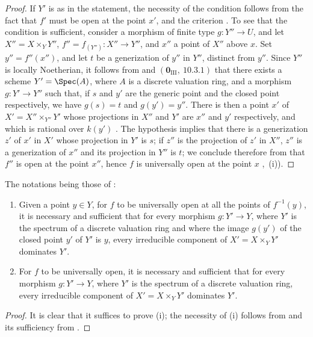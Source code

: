 \begin{proof}
If $Y'$ is as in the statement, the necessity of the condition follows from the fact that $f'$ must be open at the point $x'$, and the criterion .
To see that the condition is sufficient, consider a morphism of finite type $g:Y''\to U$, and let $X''=X\times_Y Y''$, $f''=f_{(Y'')}:X''\to Y''$, and $x''$ a point of $X''$ above $x$.
Set $y''=f''(x'')$, and let $t$ be a generization of $y''$ in $Y''$, distinct from $y''$.
Since $Y''$ is locally Noetherian, it follows from  and $(\mathbf{0}_{\mathrm{III}},~10.3.1)$ that there exists a scheme $Y'=\Spec(A)$, where $A$ is a discrete valuation ring, and a morphism $g:Y'\to Y''$ such that, if $s$ and $y'$ are the generic point and the closed point respectively, we have $g(s)=t$ and $g(y')=y''$.
There is then a point $x'$ of $X'=X''\times_{Y''}Y'$ whose projections in $X''$ and $Y'$ are $x''$ and $y'$ respectively, and which is rational over $k(y')$ .
The hypothesis implies that there is a generization $z'$ of $x'$ in $X'$ whose projection in $Y'$ is $s$; if $z''$ is the projection of $z'$ in $X''$, $z''$ is a generization of $x''$ and its projection in $Y''$ is $t$; we conclude therefore from  that $f''$ is open at the point $x''$, hence $f$ is universally open at the point $x$ ,~(i)).
\end{proof}

\begin{corollary}[14.3.7]
\label{IV.14.3.7}
The notations being those of :
\begin{enumerate}[label=(\roman*)]
  \item Given a point $y\in Y$, for $f$ to be universally open at all the points of $f^{-1}(y)$, it is necessary and sufficient that for every morphism $g:Y'\to Y$, where $Y'$ is the spectrum of a discrete valuation ring and where the image $g(y')$ of the closed point $y'$ of $Y'$ is $y$, every irreducible component of $X'=X\times_Y Y'$ dominates $Y'$.
  \item For $f$ to be universally open, it is necessary and sufficient that for every morphism $g:Y'\to Y$, where $Y'$ is the spectrum of a discrete valuation ring, every irreducible component of $X'=X\times_Y Y'$ dominates $Y'$.
\end{enumerate}
\end{corollary}

\begin{proof}
It is clear that it suffices to prove (i); the necessity of (i) follows from  and its sufficiency from .
\end{proof}

